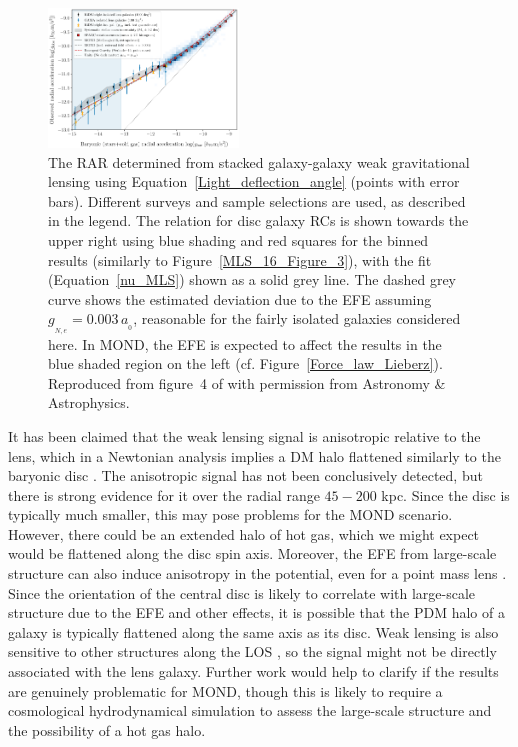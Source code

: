 \documentclass[fleqn,usenatbib,useAMS,onecolumn]{mnras} %
\begin{document}
\begin{figure}
	\centering
	\includegraphics[width=0.45\textwidth]{Brouwer_2021_Figure_4}
	\caption{The RAR determined from stacked galaxy-galaxy weak gravitational lensing using Equation~\ref{Light_deflection_angle} (points with error bars). Different surveys and sample selections are used, as described in the legend. The relation for disc galaxy RCs is shown towards the upper right using blue shading and red squares for the binned results (similarly to Figure~\ref{MLS_16_Figure_3}), with the fit (Equation~\ref{nu_MLS}) shown as a solid grey line. The dashed grey curve shows the estimated deviation due to the EFE assuming $g_{_{N,e}} = 0.003 \, a_{_0}$, reasonable for the fairly isolated galaxies considered here. In MOND, the EFE is expected to affect the results in the blue shaded region on the left (cf. Figure~\ref{Force_law_Lieberz}). Reproduced from figure~4 of \citet{Brouwer_2021} with permission from Astronomy \& Astrophysics.}
	\label{Brouwer_2021_Figure_4}
\end{figure}

It has been claimed that the weak lensing signal is anisotropic relative to the lens, which in a Newtonian analysis implies a DM halo flattened similarly to the baryonic disc \citep{Schrabback_2021}. The anisotropic signal has not been conclusively detected, but there is strong evidence for it over the radial range $45-200$ kpc. Since the disc is typically much smaller, this may pose problems for the MOND scenario. However, there could be an extended halo of hot gas, which we might expect would be flattened along the disc spin axis. Moreover, the EFE from large-scale structure can also induce anisotropy in the potential, even for a point mass lens \citep[Equation~\ref{Point_mass_EFE_QUMOND}; see also][]{Oria_2021}. Since the orientation of the central disc is likely to correlate with large-scale structure due to the EFE and other effects, it is possible that the PDM halo of a galaxy is typically flattened along the same axis as its disc. Weak lensing is also sensitive to other structures along the LOS \citep{Feix_2008}, so the signal might not be directly associated with the lens galaxy. Further work would help to clarify if the results are genuinely problematic for MOND, though this is likely to require a cosmological hydrodynamical simulation to assess the large-scale structure and the possibility of a hot gas halo.
\end{document}
